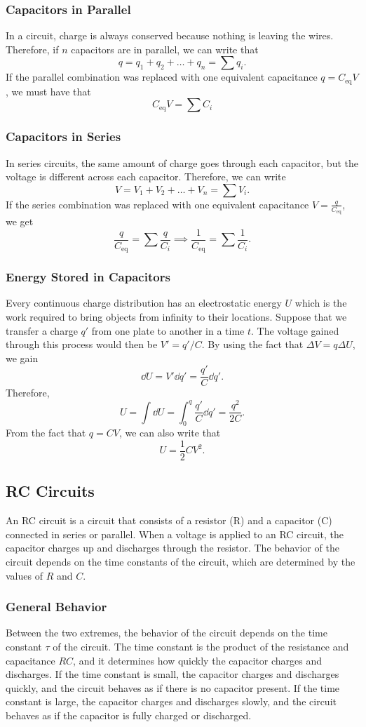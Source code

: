 \documentclass[12pt]{article}
\begin{document}
  \subsubsection{Capacitors in Parallel}
  In a circuit, charge is always conserved because nothing is leaving the wires. Therefore, if $n$ capacitors are in parallel, we can write that 
  \[q = q_1 + q_2 + \dots + q_n = \sum q_i.\]
  If the parallel combination was replaced with one equivalent capacitance $q = C_{\text{eq}} V$, we must have that 
  \[C_{\text{eq}} V = \sum C_i \]
  \subsubsection{Capacitors in Series}
  In series circuits, the same amount of charge goes through each capacitor, but the voltage is different across each capacitor. Therefore, we can write 
  \[V = V_1 + V_2 + \dots + V_n = \sum V_i.\]
  If the series combination was replaced with one equivalent capacitance $V = \frac{q}{C_{\text{eq}}}$, we get 
  \[\frac{q}{C_{\text{eq}}} = \sum \frac{q}{C_i}\implies \frac{1}{C_{\text{eq}}} = \sum \frac{1}{C_i}.\]
  \subsubsection{Energy Stored in Capacitors}
  Every continuous charge distribution has an electrostatic energy $U$ which is the work required to bring objects from infinity to their locations. Suppose that we transfer a charge $q'$ from one plate to another in a time $t$. The voltage gained through this process would then be $V' = q'/C$. By using the fact that $\Delta V = q\Delta U$, we gain 
  \[\dd U = V' \dd q' = \frac{q'}{C} \dd q'.\]
  Therefore, 
  \[U = \int \dd U = \int_{0}^{q} \frac{q'}{C}\dd q' = \frac{q^2}{2C}.\]
  From the fact that $q = CV$, we can also write that 
  \[U = \frac{1}{2}CV^2.\]
  \subsection{RC Circuits}
  An RC circuit is a circuit that consists of a resistor (R) and a capacitor (C) connected in series or parallel. When a voltage is applied to an RC circuit, the capacitor charges up and discharges through the resistor. The behavior of the circuit depends on the time constants of the circuit, which are determined by the values of $R$ and $C$.
  \subsubsection{General Behavior}
Between the two extremes, the behavior of the circuit depends on the time constant $\tau$ of the circuit. The time constant is the product of the resistance and capacitance $RC$, and it determines how quickly the capacitor charges and discharges. If the time constant is small, the capacitor charges and discharges quickly, and the circuit behaves as if there is no capacitor present. If the time constant is large, the capacitor charges and discharges slowly, and the circuit behaves as if the capacitor is fully charged or discharged. 
\end{document}
